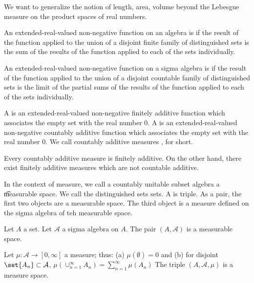 

We want to generalize the notion of length, area, volume beyond the Lebesgue measure on the product spaces of real numbers.


An extended-real-valued non-negative
function on an algebra is
if the result of the function applied to
the union of a disjoint finite family of
distinguished sets is the sum of the
results of the function applied to each
of the sets individually.

An extended-real-valued non-negative
function on a sigma algebra is
if the result of the function applied to
the union of a disjoint countable family of
distinguished sets is the limit of the partial
sums of the results of the function applied
to each of the sets individually.

A
is an extended-real-valued non-negative
finitely additive function which associates the empty
set with the real number $0$.
A
is an extended-real-valued non-negative
countably additive function which associates the empty
set with the real number $0$.
We call countably additive measures
, for short.

Every countably additive measure is finitely additive.
On the other hand, there exist finitely additive measures
which are not countable additive.

In the context of measure,
we call a countably unitable subset algebra
a \t{measurable space}.
We call the distinguished sets
sets.
A
is triple.
As a pair, the first two
objects are a measurable space.
The third object is a measure defined
on the sigma algebra of teh measurable space.


Let $A$ a set.
Let $\mathcal{A}$ a sigma algebra on $A$.
The pair $(A, \mathcal{A})$ is a measurable space.

Let $\mu: \mathcal{A} \to [0, \infty]$ a measure;
thus:
(a) $\mu(\emptyset) = 0$ and
(b) for disjoint $\set{A_n} \subset \mathcal{A}$,
$\mu(\cup_{n = 1}^{\infty} A_n)
  = \sum_{n = 1}^{\infty} \mu(A_n)$
The triple $(A, \mathcal{A}, \mu)$ is a
measure space.

